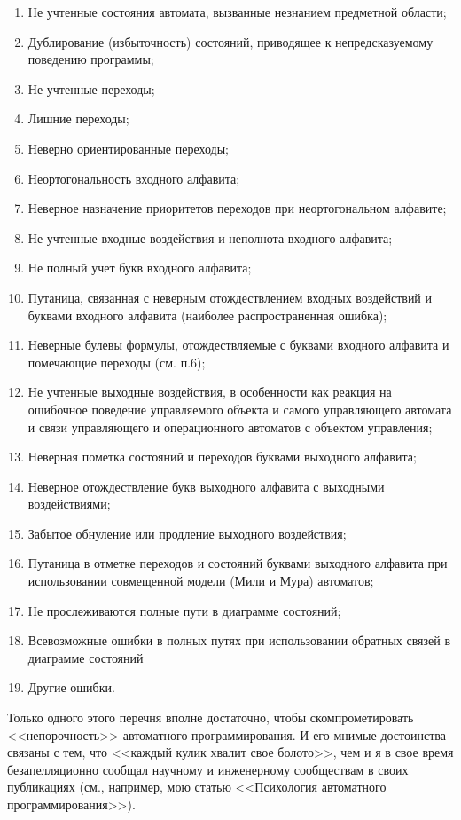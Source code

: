 \documentclass[12pt, twoside]{report}
\begin{document}
\begin{enumerate}
  \item Не учтенные состояния автомата, вызванные незнанием предметной области;
  \item Дублирование (избыточность) состояний, приводящее к непредсказуемому поведению программы;
  \item Не учтенные переходы;
  \item Лишние переходы;
  \item Неверно ориентированные переходы;
  \item Неортогональность входного алфавита;
  \item Неверное назначение приоритетов переходов при неортогональном алфавите;
  \item Не учтенные входные воздействия и неполнота входного алфавита;
  \item Не полный учет букв входного алфавита;
  \item Путаница, связанная с неверным отождествлением входных воздействий и буквами входного алфавита (наиболее распространенная ошибка);
  \item Неверные булевы формулы, отождествляемые с буквами входного алфавита и помечающие переходы (см. п.6);
  \item Не учтенные выходные воздействия, в особенности как реакция на ошибочное поведение управляемого объекта и самого управляющего автомата и связи управляющего и операционного автоматов с объектом управления;
  \item Неверная пометка состояний и переходов буквами выходного алфавита;
  \item Неверное отождествление букв выходного алфавита с выходными воздействиями;
  \item Забытое обнуление или продление выходного воздействия;
  \item Путаница в отметке переходов и состояний буквами выходного алфавита при использовании совмещенной модели (Мили и Мура) автоматов;
  \item Не прослеживаются полные пути в диаграмме состояний;
  \item Всевозможные ошибки в полных путях при использовании обратных связей в диаграмме состояний
  \item Другие ошибки.
\end{enumerate}
Только одного этого перечня вполне достаточно, чтобы скомпрометировать <<непорочность>> автоматного программирования.
И его мнимые достоинства связаны с тем, что <<каждый кулик хвалит свое болото>>, чем и я в свое время безапелляционно
сообщал научному и инженерному сообществам в своих публикациях (см., например, мою статью <<Психология автоматного программирования>>).
\end{document}
